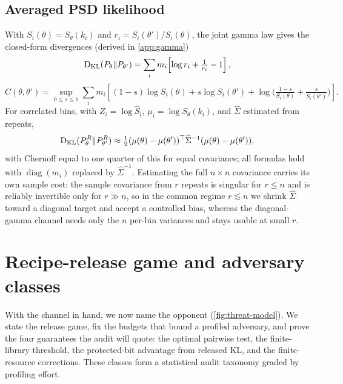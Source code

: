 \documentclass[11pt]{article}
\DeclareMathOperator{\KL}{D_{\rm KL}}
\begin{document}
\subsection{Averaged PSD likelihood}

With \(S_i(\theta)=S_\theta(k_i)\) and \(r_i=S_i(\theta')/S_i(\theta)\), the joint gamma law gives the closed-form divergences (derived in \cref{app:gamma})
\begin{equation}
\KL(P_\theta\Vert P_{\theta'})=\sum_i m_i\!\left[\log r_i+\tfrac{1}{r_i}-1\right],
\label{eq:gamma-kl}
\end{equation}
\begin{equation}
C(\theta,\theta')=\sup_{0\le s\le1}\sum_i m_i\!\left[(1-s)\log S_i(\theta)+s\log S_i(\theta')+\log\!\Big(\tfrac{1-s}{S_i(\theta)}+\tfrac{s}{S_i(\theta')}\Big)\right].
\label{eq:chernoff}
\end{equation}
For correlated bins, with \(Z_i=\log\widehat S_i\), \(\mu_i=\log S_\theta(k_i)\), and \(\widehat\Sigma\) estimated from repeats,
\begin{equation}
\KL(P_\theta^R\Vert P_{\theta'}^R)\approx\tfrac12(\mu(\theta)-\mu(\theta'))^\top\widehat\Sigma^{-1}(\mu(\theta)-\mu(\theta')),
\label{eq:cov-kl}
\end{equation}
with Chernoff equal to one quarter of this for equal covariance; all formulas hold with \(\operatorname{diag}(m_i)\) replaced by \(\widehat\Sigma^{-1}\). Estimating the full \(n\times n\) covariance carries its own sample cost: the sample covariance from \(r\) repeats is singular for \(r\le n\) and is reliably invertible only for \(r\gg n\), so in the common regime \(r\lesssim n\) we shrink \(\widehat\Sigma\) toward a diagonal target \cite{ledoit2004} and accept a controlled bias, whereas the diagonal-gamma channel needs only the \(n\) per-bin variances and stays usable at small \(r\).

\section{Recipe-release game and adversary classes}
\label{sec:game}

With the channel in hand, we now name the opponent (\cref{fig:threat-model}). We state the release game, fix the budgets that bound a profiled adversary, and prove the four guarantees the audit will quote: the optimal pairwise test, the finite-library threshold, the protected-bit advantage from released KL, and the finite-resource corrections. These classes form a statistical audit taxonomy graded by profiling effort.
\end{document}
